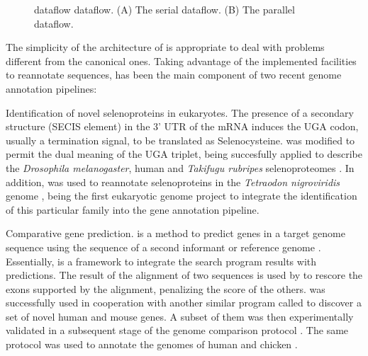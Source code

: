\begin{figure}[t!]
\begin{center}
\setlength{\fboxsep}{2pt}
          { dataflow}%
          { dataflow.}%
          {(A) The serial dataflow. (B) The parallel dataflow.}
\end{center}
\end{figure}


The simplicity of the architecture of  is appropriate to deal with
problems different from the canonical ones. Taking advantage of the implemented facilities to 
reannotate sequences,  has been the main component of two recent genome annotation 
pipelines:

\begin{menumerate}
\item
Identification of novel selenoproteins in eukaryotes.
The presence of a secondary structure (SECIS element) in the 3' UTR of the mRNA induces the 
UGA codon, usually a termination signal, to be translated as Selenocysteine.  was 
modified to permit the dual meaning of the UGA triplet, being succesfully applied to describe the 
\emph{Drosophila melanogaster}, human and \emph{Takifugu rubripes} selenoproteomes 
\citep{castellano:2001a, kryukov:2003a, castellano:2004a}. 
In addition,  was used to reannotate selenoproteins in the \emph{Tetraodon nigroviridis} 
genome \citep{jaillon:2004a}, being the first eukaryotic genome project to integrate the 
identification of this particular family into the gene annotation pipeline.
\item
Comparative gene prediction.
 is a method to predict genes in a target genome sequence using the sequence of a
second informant or reference genome \citep{parra:2003a}. Essentially,  
is a framework to integrate the search program  results with
 predictions. The result of the  alignment of two sequences
is used by  to rescore the exons supported by the alignment, 
penalizing the score of the others.  was successfully used in cooperation 
with another similar program called  \citep{korf:2001a} to discover 
a set of novel human and mouse genes. A subset of them was then experimentally 
validated in a subsequent stage of the genome comparison protocol \citep{guigo:2003a}.
The same protocol was used to annotate the genomes of human and chicken \citep{hillier:2004a}.
\end{menumerate}

